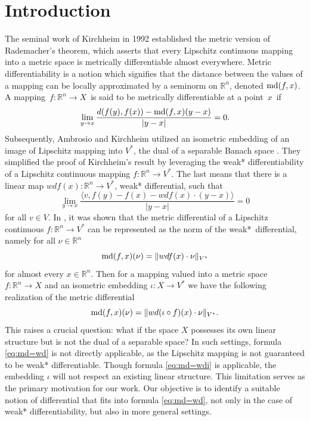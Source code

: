 \documentclass[reqno]{amsart}
\begin{document}
\section{Introduction}
The seminal work \cite{K1994} of Kirchheim in 1992 established the metric version of Rademacher's theorem, which asserts that every Lipschitz continuous mapping into a metric space is metrically differentiable almost everywhere.
Metric differentiability is a notion which signifies that the distance between the values of a mapping can be locally approximated by a seminorm on $\mathbb R^n$, denoted $\textnormal{md}(f, x)$.
A mapping $f: \mathbb R^n\to X$ is said to be metrically differentiable at a point $x$ if
\[
\lim_{y\to x}\frac{d(f(y), f(x)) - \textnormal{md}(f, x)(y-x)}{|y-x|} = 0.
\]
Subsequently, Ambrosio and Kirchheim utilized an isometric embedding of an image of Lipschitz mapping into $V^*$, the dual of a separable Banach space  \cite{AK2000}.
They simplified the proof of Kirchheim's result by leveraging the weak* differentiability of a Lipschitz continuous mapping 
$f:\mathbb R^n\to V^*$.
The last means that there is a linear map $wdf(x):\mathbb R^n\to V^*$, weak* differential, such that
\[
\lim_{y\to x}\frac{\langle v, f(y) - f(x) - wdf(x)\cdot(y-x)\rangle}{|y-x|} = 0
\]
for all $v\in V$.
In \cite{AK2000}, it was shown that the metric differential of a Lipschitz continuous $f:\mathbb R^n\to V^*$ can be represented as the norm of the weak* differential, namely for all $\nu\in\mathbb R^n$
\begin{equation}\label{eq:md=wd}
\textnormal{md}(f, x)(\nu) = \| wdf(x)\cdot\nu\|_{V^*}
\end{equation}
for almost every $x\in\mathbb R^n$.
Then for a mapping valued into a metric space $f:\mathbb R^n\to X$ and an isometric embedding $\iota \colon X\to V^*$ 
we have the following realization of the metric differential
\begin{equation}\label{eq:md=wdi}
\textnormal{md}(f, x)(\nu) = \| wd(\iota\circ f)(x)\cdot\nu\|_{V^*}.
\end{equation} 
This raises a crucial question: what if the space $X$ possesses its own linear structure but is not the dual of a separable space? In such settings, formula  \eqref{eq:md=wd} is not directly applicable, as the Lipschitz mapping is not guaranteed to be weak* differentiable. 
Though formula \eqref{eq:md=wdi} is applicable, the embedding $\iota$ will not respect an existing linear structure.
This limitation serves as the primary motivation for our work.
Our objective is to identify a suitable notion of differential that fits into formula \eqref{eq:md=wd}, not only in the case of weak* differentiability, but also in more general settings.
\end{document}
